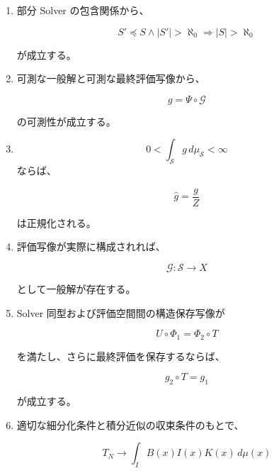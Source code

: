 \documentclass[a4paper,11pt]{article}
\newcommand{\Solver}{\mathcal{S}}
\newcommand{\SubSolver}{\preceq}
\newcommand{\Eval}{\mathcal{G}}
\newcommand{\EvalMap}{\Psi}
\begin{document}
\begin{enumerate}

\item
部分 Solver の包含関係から、

\begin{equation}
    S'\SubSolver S
    \land
    |S'|>\aleph_0
    \Longrightarrow
    |S|>\aleph_0
\end{equation}

が成立する。

\item
可測な一般解と可測な最終評価写像から、

\begin{equation}
    g=\EvalMap\circ\Eval
\end{equation}

の可測性が成立する。

\item
\[
    0<
    \int_{\Solver}g\,d\mu_{\Solver}
    <\infty
\]
ならば、

\begin{equation}
    \widehat g
    =
    \frac{g}{Z}
\end{equation}

は正規化される。

\item
評価写像が実際に構成されれば、

\begin{equation}
    \Eval:\Solver\to X
\end{equation}

として一般解が存在する。

\item
Solver 同型および評価空間間の構造保存写像が

\begin{equation}
    U\circ\Phi_1
    =
    \Phi_2\circ T
\end{equation}

を満たし、さらに最終評価を保存するならば、

\begin{equation}
    g_2\circ T=g_1
\end{equation}

が成立する。

\item
適切な細分化条件と積分近似の収束条件のもとで、

\begin{equation}
    T_N
    \longrightarrow
    \int_I B(x)I(x)K(x)\,d\mu(x)
\end{equation}


\end{enumerate}
\end{document}
